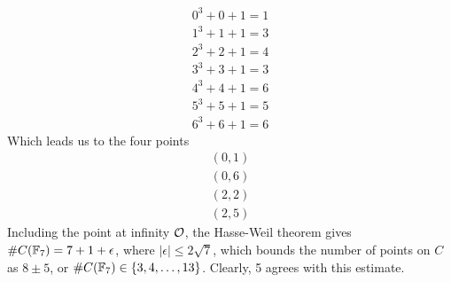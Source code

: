 \begin{align*}
0^3 + 0 + 1 = 1\\
1^3 + 1 + 1 = 3\\
2^3 + 2 + 1 = 4\\
3^3 + 3 + 1 = 3\\
4^3 + 4 + 1 = 6\\
5^3 + 5 + 1 = 5\\
6^3 + 6 + 1 = 6
\end{align*}
Which leads us to the four points
\begin{align*}
(0,1)\\
(0,6)\\
(2,2)\\
(2,5)
\end{align*}
Including the point at infinity $\pai$, the Hasse-Weil theorem gives $\#C(\fp[7]) = 7 + 1 + \epsilon$, where $|\epsilon| \leq 2\sqrt{7}$, which bounds the number of points on $C$ as $8\pm5$, or $\#C(\fp[7]) \in \{3,4,\ldots,13\}$.
Clearly, 5 agrees with this estimate.
